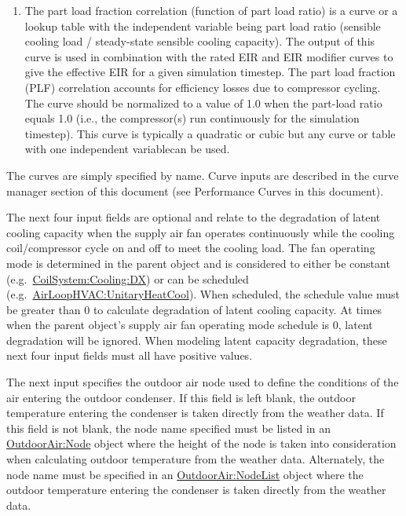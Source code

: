 \begin{enumerate}
\item
  The part load fraction correlation (function of part load ratio) is a curve or a lookup table with the independent variable being part load ratio (sensible cooling load / steady-state sensible cooling capacity). The output of this curve is used in combination with the rated EIR and EIR modifier curves to give the effective EIR for a given simulation timestep. The part load fraction (PLF) correlation accounts for efficiency losses due to compressor cycling. The curve should be normalized to a value of 1.0 when the part-load ratio equals 1.0 (i.e., the compressor(s) run continuously for the simulation timestep). This curve is typically a quadratic or cubic but any curve or table with one independent variablecan be used.
\end{enumerate}

The curves are simply specified by name. Curve inputs are described in the curve manager section of this document (see Performance Curves in this document).

The next four input fields are optional and relate to the degradation of latent cooling capacity when the supply air fan operates continuously while the cooling coil/compressor cycle on and off to meet the cooling load. The fan operating mode is determined in the parent object and is considered to either be constant (e.g.~\hyperref[coilsystemcoolingdx]{CoilSystem:Cooling:DX}) or can be scheduled (e.g.~\hyperref[airloophvacunitaryheatcool]{AirLoopHVAC:UnitaryHeatCool}). When scheduled, the schedule value must be greater than 0 to calculate degradation of latent cooling capacity. At times when the parent object's supply air fan operating mode schedule is 0, latent degradation will be ignored. When modeling latent capacity degradation, these next four input fields must all have positive values.

The next input specifies the outdoor air node used to define the conditions of the air entering the outdoor condenser. If this field is left blank, the outdoor temperature entering the condenser is taken directly from the weather data. If this field is not blank, the node name specified must be listed in an \hyperref[outdoorairnode]{OutdoorAir:Node} object where the height of the node is taken into consideration when calculating outdoor temperature from the weather data. Alternately, the node name must be specified in an \hyperref[outdoorairnodelist]{OutdoorAir:NodeList} object where the outdoor temperature entering the condenser is taken directly from the weather data.

